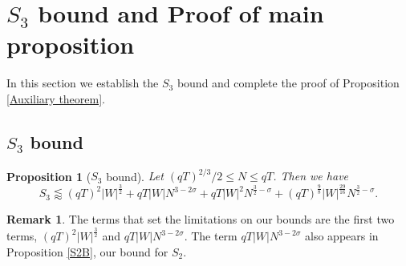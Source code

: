 \documentclass[12pt]{amsart}
\newtheorem{proposition}[theorem]{Proposition}
\theoremstyle{definition}
\newtheorem{remark}[theorem]{Remark}
\theoremstyle{plain}
\theoremstyle{remark}
\numberwithin{equation}{section}
\numberwithin{theorem}{section}
\numberwithin{equation}{section}
\begin{document}
	\section{\texorpdfstring{$S_{3}$ bound and Proof of main proposition}
		{S3 bound and Proof of main proposition}}\label{S3bandpomp}
	In this section we establish the $S_{3}$ bound and complete the proof of Proposition \ref{Auxiliary theorem}.
	\subsection{\texorpdfstring{$S_{3}$ bound}
		{S3 bound}}\label{Pofmaipro1}
	\begin{proposition}[$S_{3}$ bound]\label{S3bound}
		Let $(qT)^{2/3}/2 \leq N \leq qT$. Then we have
		\[
		S_{3}\lessapprox (qT)^2 |W|^{\frac{3}{2}}+qT|W|N^{3-2\sigma}+qT|W|^2N^{\frac{3}{2}-\sigma}+(qT)^{\frac{9}{8}}|W|^{\frac{29}{16}}N^{\frac{3}{2}-\sigma}.
		\]
	\end{proposition}
	\begin{remark}
		The terms that set the limitations on our bounds are the first two terms, $(qT)^2|W|^{\frac{3}{2}}$ and $qT|W|N^{3-2\sigma}$. The term $qT|W|N^{3-2\sigma}$ also appears in Proposition \ref{S2B}, our bound for $S_2$. 
	\end{remark}
\end{document}
